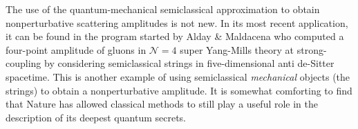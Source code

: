 The use of the quantum-mechanical semiclassical approximation to obtain nonperturbative scattering amplitudes is not new. In its most recent application, it can be found in the program started by Alday \& Maldacena \cite{Alday:2007hr} who computed a four-point amplitude of gluons in $\mathcal{N} = 4$ super Yang-Mills theory at strong-coupling by considering semiclassical strings in five-dimensional anti de-Sitter spacetime. This is another example of using semiclassical \textit{mechanical} objects (the strings) to obtain a nonperturbative amplitude. It is somewhat comforting to find that Nature has allowed classical methods to still play a useful role in the description of its deepest quantum secrets.